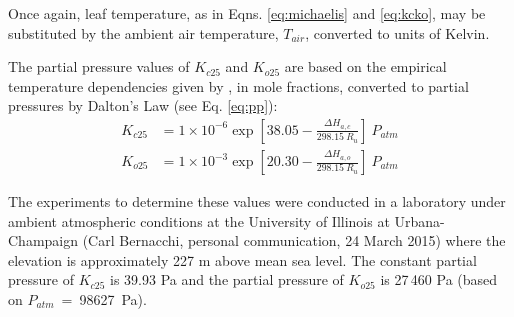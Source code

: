 \noindent Once again, leaf temperature, as in Eqns. \ref{eq:michaelis} and \ref{eq:kcko}, may be substituted by the ambient air temperature, $T_{air}$, converted to units of Kelvin. 

The partial pressure values of $K_{c25}$ and $K_{o25}$ are based on the empirical temperature dependencies given by \cite{bernacchi01}, in mole fractions, converted to partial pressures by Dalton's Law (see Eq. \ref{eq:pp}):
%
%
\begin{subequations}
\label{eq:kcko25}
\begin{align}
	K_{c25}&=1\times 10^{-6} \exp \left[ 38.05 - 
    	\frac{\Delta H_{a,c}}{298.15\: R_{u}}
    \right]\: P_{atm} \label{eq:kc25} \\
    K_{o25}&=1\times 10^{-3} \exp \left[ 20.30 - 
    	\frac{\Delta H_{a,o}}{298.15\: R_{u}}
    \right]\: P_{atm} \label{eq:ko25}
\end{align}
\end{subequations}

\noindent The experiments to determine these values were conducted in a laboratory under ambient atmospheric conditions at the University of Illinois at Urbana-Champaign (Carl Bernacchi, personal communication, 24 March 2015) where the elevation is approximately 227 m above mean sea level. 
The constant partial pressure of $K_{c25}$ is 39.93 Pa and the partial pressure of $K_{o25}$ is 27$\,$460 Pa (based on $P_{atm}$~=~98627~Pa).

